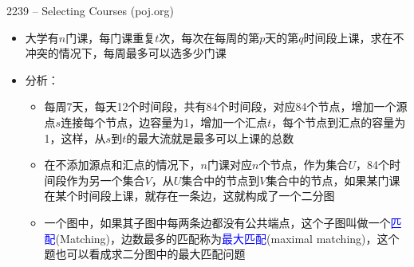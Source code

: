 \begin{frame}{2239 -- Selecting Courses (poj.org)}
    \begin{itemize}
        \item 大学有$n$门课，每门课重复$t$次，每次在每周的第$p$天的第$q$时间段上课，求在不冲突的情况下，每周最多可以选多少门课
        \item 分析：
        \begin{itemize}
            \item 每周7天，每天12个时间段，共有84个时间段，对应84个节点，增加一个源点$s$连接每个节点，边容量为1，增加一个汇点$t$，每个节点到汇点的容量为1，这样，从$s$到$t$的最大流就是最多可以上课的总数
            \item 在不添加源点和汇点的情况下，$n$门课对应$n$个节点，作为集合$U$，84个时间段作为另一个集合$V$，从$U$集合中的节点到$V$集合中的节点，如果某门课在某个时间段上课，就存在一条边，这就构成了一个二分图
            \item 一个图中，如果其子图中每两条边都没有公共端点，这个子图叫做一个\textcolor{blue}{匹配}(Matching)，边数最多的匹配称为\textcolor{blue}{最大匹配}(maximal matching)，这个题也可以看成求二分图中的最大匹配问题
        \end{itemize}
    \end{itemize}
\end{frame}
